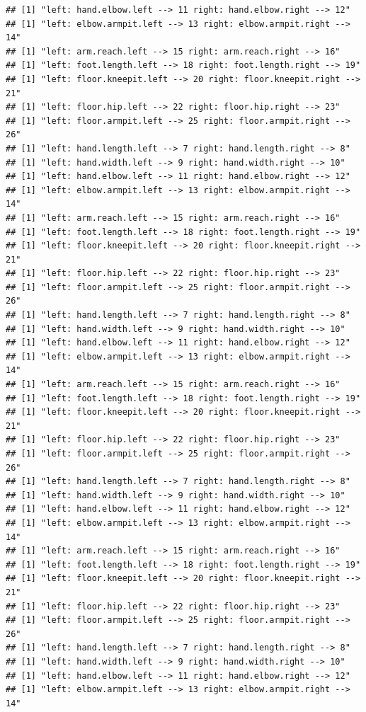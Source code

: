 \documentclass[]{article}
\begin{document}
\begin{verbatim}
## [1] "left: hand.elbow.left --> 11 right: hand.elbow.right --> 12"
## [1] "left: elbow.armpit.left --> 13 right: elbow.armpit.right --> 14"
## [1] "left: arm.reach.left --> 15 right: arm.reach.right --> 16"
## [1] "left: foot.length.left --> 18 right: foot.length.right --> 19"
## [1] "left: floor.kneepit.left --> 20 right: floor.kneepit.right --> 21"
## [1] "left: floor.hip.left --> 22 right: floor.hip.right --> 23"
## [1] "left: floor.armpit.left --> 25 right: floor.armpit.right --> 26"
## [1] "left: hand.length.left --> 7 right: hand.length.right --> 8"
## [1] "left: hand.width.left --> 9 right: hand.width.right --> 10"
## [1] "left: hand.elbow.left --> 11 right: hand.elbow.right --> 12"
## [1] "left: elbow.armpit.left --> 13 right: elbow.armpit.right --> 14"
## [1] "left: arm.reach.left --> 15 right: arm.reach.right --> 16"
## [1] "left: foot.length.left --> 18 right: foot.length.right --> 19"
## [1] "left: floor.kneepit.left --> 20 right: floor.kneepit.right --> 21"
## [1] "left: floor.hip.left --> 22 right: floor.hip.right --> 23"
## [1] "left: floor.armpit.left --> 25 right: floor.armpit.right --> 26"
## [1] "left: hand.length.left --> 7 right: hand.length.right --> 8"
## [1] "left: hand.width.left --> 9 right: hand.width.right --> 10"
## [1] "left: hand.elbow.left --> 11 right: hand.elbow.right --> 12"
## [1] "left: elbow.armpit.left --> 13 right: elbow.armpit.right --> 14"
## [1] "left: arm.reach.left --> 15 right: arm.reach.right --> 16"
## [1] "left: foot.length.left --> 18 right: foot.length.right --> 19"
## [1] "left: floor.kneepit.left --> 20 right: floor.kneepit.right --> 21"
## [1] "left: floor.hip.left --> 22 right: floor.hip.right --> 23"
## [1] "left: floor.armpit.left --> 25 right: floor.armpit.right --> 26"
## [1] "left: hand.length.left --> 7 right: hand.length.right --> 8"
## [1] "left: hand.width.left --> 9 right: hand.width.right --> 10"
## [1] "left: hand.elbow.left --> 11 right: hand.elbow.right --> 12"
## [1] "left: elbow.armpit.left --> 13 right: elbow.armpit.right --> 14"
## [1] "left: arm.reach.left --> 15 right: arm.reach.right --> 16"
## [1] "left: foot.length.left --> 18 right: foot.length.right --> 19"
## [1] "left: floor.kneepit.left --> 20 right: floor.kneepit.right --> 21"
## [1] "left: floor.hip.left --> 22 right: floor.hip.right --> 23"
## [1] "left: floor.armpit.left --> 25 right: floor.armpit.right --> 26"
## [1] "left: hand.length.left --> 7 right: hand.length.right --> 8"
## [1] "left: hand.width.left --> 9 right: hand.width.right --> 10"
## [1] "left: hand.elbow.left --> 11 right: hand.elbow.right --> 12"
## [1] "left: elbow.armpit.left --> 13 right: elbow.armpit.right --> 14"

\end{verbatim}
\end{document}
